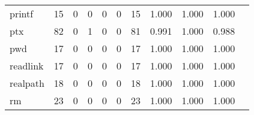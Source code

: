 \begin{longtable}{lp{1.2cm}p{1.2cm}p{1.2cm}p{1.2cm}p{1.2cm}p{1.2cm}p{1.2cm}p{1.2cm}p{1.2cm}p{1.2cm}}
printf    &                                    15 &                                                  0 &                                                  0 &                                                  0 &                                                  0 &                                                 15 &                                              1.000 &                                              1.000 &                                              1.000 \\
ptx       &                                    82 &                                                  0 &                                                  1 &                                                  0 &                                                  0 &                                                 81 &                                              0.991 &                                              1.000 &                                              0.988 \\
pwd       &                                    17 &                                                  0 &                                                  0 &                                                  0 &                                                  0 &                                                 17 &                                              1.000 &                                              1.000 &                                              1.000 \\
readlink  &                                    17 &                                                  0 &                                                  0 &                                                  0 &                                                  0 &                                                 17 &                                              1.000 &                                              1.000 &                                              1.000 \\
realpath  &                                    18 &                                                  0 &                                                  0 &                                                  0 &                                                  0 &                                                 18 &                                              1.000 &                                              1.000 &                                              1.000 \\
rm        &                                    23 &                                                  0 &                                                  0 &                                                  0 &                                                  0 &                                                 23 &                                              1.000 &                                              1.000 &                                              1.000 \\

\end{longtable}
